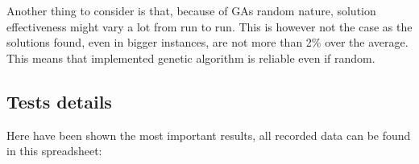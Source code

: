 		Another thing to consider is that, because of GAs random nature, solution effectiveness might vary a lot from run to run. This is however not the case as the solutions found, even in bigger instances, are not more than 2\% over the average. This means that implemented genetic algorithm is reliable even if random.
		
	\subsection{Tests details}
		Here have been shown the most important results, all recorded data can be found in this spreadsheet:
		
		\href{https://docs.google.com/spreadsheets/d/1wJ98av-soxw_okteJ7X8zMJUfesh_16ECjA9uRbP8Hg/edit?usp=sharing}{\color{blue}{https://docs.google.com/spreadsheets/d/1wJ98av-soxw\_okteJ7X8zMJUfesh\_16ECjA9uRbP8Hg/edit?usp=sharing}}
		